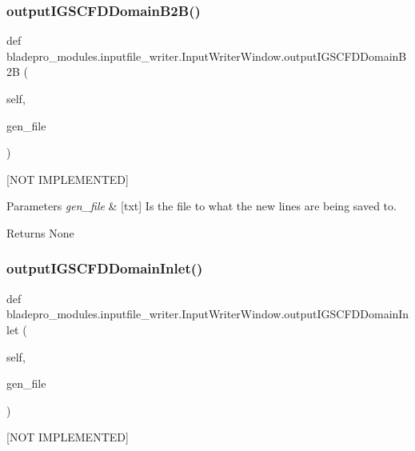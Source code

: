 \subsubsection{\texorpdfstring{output\+I\+G\+S\+C\+F\+D\+Domain\+B2\+B()}{outputIGSCFDDomainB2B()}}
{\footnotesize\ttfamily def bladepro\+\_\+modules.\+inputfile\+\_\+writer.\+Input\+Writer\+Window.\+output\+I\+G\+S\+C\+F\+D\+Domain\+B2B (\begin{DoxyParamCaption}\item[{}]{self,  }\item[{}]{gen\+\_\+file }\end{DoxyParamCaption})}



\mbox{[}N\+OT I\+M\+P\+L\+E\+M\+E\+N\+T\+ED\mbox{]} 


\begin{DoxyParams}{Parameters}
{\em gen\+\_\+file} & \mbox{[}txt\mbox{]} Is the file to what the new lines are being saved to. \\
\hline
\end{DoxyParams}
\begin{DoxyReturn}{Returns}
None 
\end{DoxyReturn}
\hypertarget{a00071_a1a577ed1880def26fc13d02701e9346a}{}\label{a00071_a1a577ed1880def26fc13d02701e9346a} 
\subsubsection{\texorpdfstring{output\+I\+G\+S\+C\+F\+D\+Domain\+Inlet()}{outputIGSCFDDomainInlet()}}
{\footnotesize\ttfamily def bladepro\+\_\+modules.\+inputfile\+\_\+writer.\+Input\+Writer\+Window.\+output\+I\+G\+S\+C\+F\+D\+Domain\+Inlet (\begin{DoxyParamCaption}\item[{}]{self,  }\item[{}]{gen\+\_\+file }\end{DoxyParamCaption})}



\mbox{[}N\+OT I\+M\+P\+L\+E\+M\+E\+N\+T\+ED\mbox{]} 


